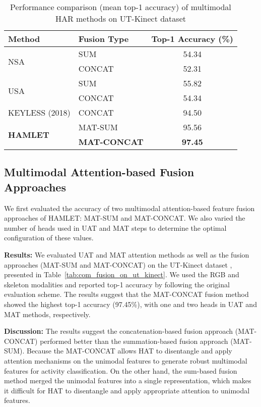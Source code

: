 \documentclass[runningheads]{llncs}
\newcommand{\pa}{HAMLET}
\newcommand{\hattn}{HAT}
\begin{document}
\begin{table}[!t]
    \centering
    \caption{Performance comparison (mean top-1 accuracy) of multimodal HAR methods on UT-Kinect dataset \cite{ut_kinect}}
    \label{tab:com_on_ut_kinect}
    \begin{tabular}{llc}
        \toprule
        \multirow{1}{*}{Method}& {Fusion Type} & Top-1 Accuracy (\%) \\
        \hline
        \multirow{2}{*}{NSA} & SUM & 54.34 \\
& CONCAT & 52.31\\
        \hline
        \multirow{2}{*}{USA} & SUM & 55.82 \\
& CONCAT & 54.34 \\
        \hline
        \multirow{1}{*}{{KEYLESS \cite{keyless} (2018)}} & CONCAT & 94.50\\
        \hline
        \multirow{2}{*}{\textbf{\pa}} & MAT-SUM & 95.56\\
& \textbf{MAT-CONCAT} & \textbf{97.45}\\
        \bottomrule
    \end{tabular}
    \vspace{-0.2in}
\end{table}






\subsection{Multimodal Attention-based Fusion Approaches}
\label{sec:attention_fusion_approach}

We first evaluated the accuracy of two multimodal attention-based feature fusion approaches of \pa: MAT-SUM and MAT-CONCAT. We also varied the number of heads used in UAT and MAT steps to determine the optimal configuration of these values.


\par \textbf{Results:} We evaluated UAT and MAT attention methods as well as the fusion approaches (MAT-SUM and MAT-CONCAT) on the UT-Kinect dataset \cite{ut_kinect}, presented in Table~\ref{tab:com_fusion_on_ut_kinect}. We used the RGB and skeleton modalities and reported top-1 accuracy by following the original evaluation scheme. The results suggest that the MAT-CONCAT fusion method showed the highest top-1 accuracy (97.45\%), with one and two heads in UAT and MAT methods, respectively.


\par \textbf{Discussion:} The results suggest the concatenation-based fusion approach (MAT-CONCAT) performed better than the summation-based fusion approach (MAT-SUM). Because the MAT-CONCAT allows {\hattn } to disentangle and apply attention mechanisms on the unimodal features to generate robust multimodal features for activity classification. On the other hand, the sum-based fusion method merged the unimodal features into a single representation, which makes it difficult for {\hattn } to disentangle and apply appropriate attention to unimodal features.
\end{document}
